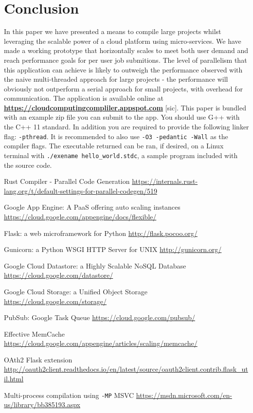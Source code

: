 \documentclass[conference]{IEEEtran}
\begin{document}
\section{Conclusion}
In this paper we have presented a means to compile large projects whilst
leveraging the scalable power of a cloud platform using micro-services. We have
made a working prototype that horizontally scales to
meet both user demand and reach performance goals for per user job submitions.
The level of parallelism that this application can achieve is likely to outweigh
the performance observed with the naive multi-threaded approach for large
projects - the performance will obviously not outperform a serial approach for
small projects, with overhead for communication.
The application is available online at
\textbf{\url{https://cloudcomputingcompliler.appspot.com}} [sic].
This paper is bundled with an example zip file you can submit to the app. You
should use G++ with the C++ 11 standard. In addition you are required to provide
the following linker flag: \texttt{-pthread}. It is recommended to also use
\texttt{-O3 -pedantic -Wall} as the compiler flags. The executable returned can
be ran, if desired, on a Linux terminal with \texttt{./exename
hello\_world.stdc}, a sample program included with the source code.

\begin{thebibliography}{00}

    Rust Compiler - Parallel Code Generation
    \url{https://internals.rust-lang.org/t/default-settings-for-parallel-codegen/519}


    Google App Engine: A PaaS offering auto scaling instances
    \url{https://cloud.google.com/appengine/docs/flexible/}

    Flask: a web microframework for Python
    \url{http://flask.pocoo.org/}

    Gunicorn: a Python WSGI HTTP Server for UNIX
    \url{http://gunicorn.org/}

    Google Cloud Datastore: a Highly Scalable NoSQL Database
    \url{https://cloud.google.com/datastore/}

    Google Cloud Storage: a Unified Object Storage
    \url{https://cloud.google.com/storage/}

   PubSub: Google Task Queue
    \url{https://cloud.google.com/pubsub/}

   Effective MemCache
    \url{https://cloud.google.com/appengine/articles/scaling/memcache/} 

   OAth2 Flask extension
    \url{http://oauth2client.readthedocs.io/en/latest/source/oauth2client.contrib.flask_util.html}

 	Multi-process compilation using \texttt{-MP} MSVC
 	\url{https://msdn.microsoft.com/en-us/library/bb385193.aspx}

\end{thebibliography}
\end{document}
